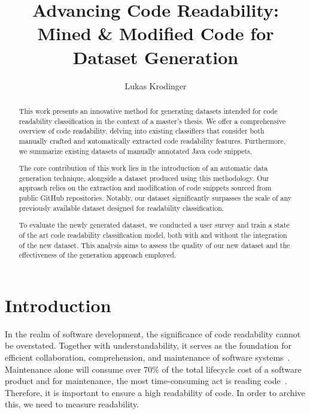\documentclass[%
class=scrreprt,
chapterprefix=false,%
open=right,%
twoside=false,%
paper=a4,%
logofile={Logo\_zentral\_farbig\_EN.png},%
thesistype=master,%
UKenglish,%
]{se2thesis}
\author{Lukas Krodinger}
\title{Advancing Code Readability: Mined \& Modified Code for Dataset Generation}
\institute{Chair of Software Engineering II}
\theoremstyle{definition}
\begin{document}
	
	\frontmatter
	
	\maketitle
	
	\begin{abstract}
		This work presents an innovative method for generating datasets intended for code readability classification in the context of a master's thesis. We offer a comprehensive overview of code readability, delving into existing classifiers that consider both manually crafted and automatically extracted code readability features. Furthermore, we summarize existing datasets of manually annotated Java code snippets.
		
		The core contribution of this work lies in the introduction of an automatic data generation technique, alongside a dataset produced using this methodology. Our approach relies on the extraction and modification of code snippets sourced from public GitHub repositories. Notably, our dataset significantly surpasses the scale of any previously available dataset designed for readability classification.
		
		To evaluate the newly generated dataset, we conducted a user survey and train a state of the art code readability classification model, both with and without the integration of the new dataset. This analysis aims to assess the quality of our new dataset and the effectiveness of the generation approach employed.

	\end{abstract}
	
	\mainmatter
	
	\tableofcontents
	
\section{Introduction} \label{Introduction}


	In the realm of software development, the significance of code readability cannot be overstated. Together with understandability, it serves as the foundation for efficient collaboration, comprehension, and maintenance of software systems~\cite{posnett2011simpler, aggarwal2002integrated}. 
	Maintenance alone will consume over 70\% of the total lifecycle cost of a software product and for maintenance, the most time-consuming act is reading code~\cite{buse2009learning, deimel1985uses, rugaber2000use, boehm2001defect}.
	Therefore, it is important to ensure a high readability of code. In order to archive this, we need to measure readability.
	
\end{document}
